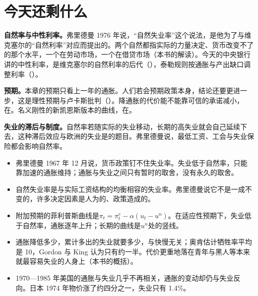 \section{今天还剩什么}\label{sec:naturalrate-legacy}

\textbf{自然率与中性利率。}弗里德曼 1976 年说，“自然失业率”这个说法，是他为了与维克塞尔的“自然利率”对应而提出的\cite{friedman1976}。两个自然都指实际的力量决定、货币改变不了的那个水平，一个在劳动市场，一个在借贷市场（本书的解读）。今天的中央银行讲的中性利率，是维克塞尔的自然利率的后代（），泰勒规则按通胀与产出缺口调整利率（）。

\textbf{预期。}本章的预期只看上一年的通胀。人们若会预期政策本身，结论还要更进一步，这是理性预期与卢卡斯批判（）。降通胀的代价能不能靠可信的承诺减小，在。名义刚性的新凯恩斯版本的曲线，在。

\textbf{失业的滞后与制度。}自然率若随实际的失业移动，长期的高失业就会自己延续下去，这种滞后效应与欧洲的失业是的题目。弗里德曼说，最低工资、工会与失业保险都会影响自然率\cite{friedman1968,friedman1976}。

\begin{takeaways}
\begin{itemize}
\item 弗里德曼 1967 年 12 月说，货币政策钉不住失业率。失业低于自然率，只能靠加速的通胀维持；通胀与失业之间只有暂时的取舍，没有永久的取舍。
\item 自然失业率是与实际工资结构的均衡相容的失业率。弗里德曼说它不是一成不变的，许多决定因素是人为的、政策造成的。
\item 附加预期的菲利普斯曲线是$\pi_t=\pi^{e}_t-\alpha(u_t-u^{n})$。在适应性预期下，失业低于自然率，通胀逐年上升；长期的曲线是$u^{n}$处的竖线。
\item 通胀降低多少，累计多出的失业就要多少，与快慢无关；奥肯估计牺牲率平均是 10，Gordon 与 King 认为只有约一半。代价更重地落在青年与黑人等本来就最容易失业的人身上（本书的概括）。
\item 1970—1985 年美国的通胀与失业几乎不再相关，通胀的变动却仍与失业反向。日本 1974 年物价涨了约四分之一，失业只有 1.4\%。
\end{itemize}
\end{takeaways}

